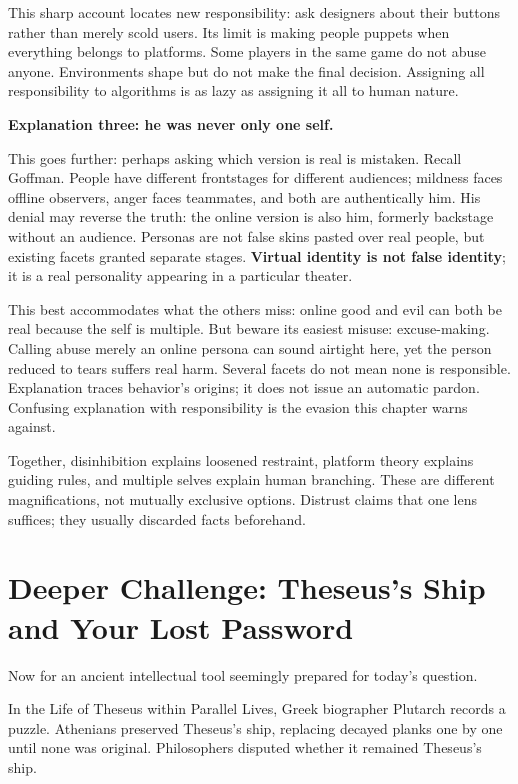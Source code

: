 This sharp account locates new responsibility: ask designers about their buttons rather than merely scold users. Its limit is making people puppets when everything belongs to platforms. Some players in the same game do not abuse anyone. Environments shape but do not make the final decision. Assigning all responsibility to algorithms is as lazy as assigning it all to human nature.

\textbf{Explanation three: he was never only one self.}

This goes further: perhaps asking which version is real is mistaken. Recall Goffman. People have different frontstages for different audiences; mildness faces offline observers, anger faces teammates, and both are authentically him. His denial may reverse the truth: the online version is also him, formerly backstage without an audience. Personas are not false skins pasted over real people, but existing facets granted separate stages. \textbf{Virtual identity is not false identity}; it is a real personality appearing in a particular theater.

This best accommodates what the others miss: online good and evil can both be real because the self is multiple. But beware its easiest misuse: excuse-making. Calling abuse merely an online persona can sound airtight here, yet the person reduced to tears suffers real harm. Several facets do not mean none is responsible. Explanation traces behavior's origins; it does not issue an automatic pardon. Confusing explanation with responsibility is the evasion this chapter warns against.

Together, disinhibition explains loosened restraint, platform theory explains guiding rules, and multiple selves explain human branching. These are different magnifications, not mutually exclusive options. Distrust claims that one lens suffices; they usually discarded facts beforehand.

\section[Theseus's Ship and Your Lost Password]{Deeper Challenge: Theseus's Ship and Your Lost Password}
Now for an ancient intellectual tool seemingly prepared for today's question.

In the Life of Theseus within Parallel Lives, Greek biographer Plutarch records a puzzle. Athenians preserved Theseus's ship, replacing decayed planks one by one until none was original. Philosophers disputed whether it remained Theseus's ship.

